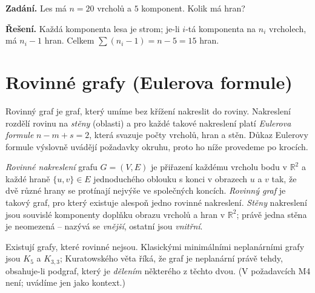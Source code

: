 \documentclass[11pt,a4paper]{article}
\begin{document}
\begin{priklad}
\textbf{Zadání.} Les má $n=20$ vrcholů a $5$ komponent. Kolik má hran?

\textbf{Řešení.} Každá komponenta lesa je strom; je-li $i$-tá komponenta na $n_i$ vrcholech, má $n_i-1$ hran. Celkem $\sum(n_i-1)=n-5=15$ hran.
\end{priklad}

\section{Rovinné grafy (Eulerova formule)}

Rovinný graf je graf, který umíme bez křížení nakreslit do roviny. Nakreslení rozdělí rovinu na \emph{stěny} (oblasti) a pro každé takové nakreslení platí \emph{Eulerova formule} $n-m+s=2$, která svazuje počty vrcholů, hran a stěn. Důkaz Eulerovy formule výslovně uvádějí požadavky okruhu, proto ho níže provedeme po krocích.

\begin{definice}
\emph{Rovinné nakreslení} grafu $G=(V,E)$ je přiřazení každému vrcholu bodu v $\mathbb{R}^2$ a každé hraně $\{u,v\}\in E$ jednoduchého oblouku s konci v obrazech $u$ a $v$ tak, že dvě různé hrany se protínají nejvýše ve společných koncích. \emph{Rovinný graf} je takový graf, pro který existuje alespoň jedno rovinné nakreslení. \emph{Stěny} nakreslení jsou souvislé komponenty doplňku obrazu vrcholů a hran v $\mathbb{R}^2$; právě jedna stěna je neomezená -- nazývá se \emph{vnější}, ostatní jsou \emph{vnitřní}.
\end{definice}


\begin{poznamka}
Existují grafy, které rovinné nejsou. Klasickými minimálními neplanárními grafy jsou $K_5$ a $K_{3,3}$; Kuratowského věta říká, že graf je neplanární právě tehdy, obsahuje-li podgraf, který je \emph{dělením} některého z těchto dvou. (V požadavcích M4 není; uvádíme jen jako kontext.)
\end{poznamka}
\end{document}
